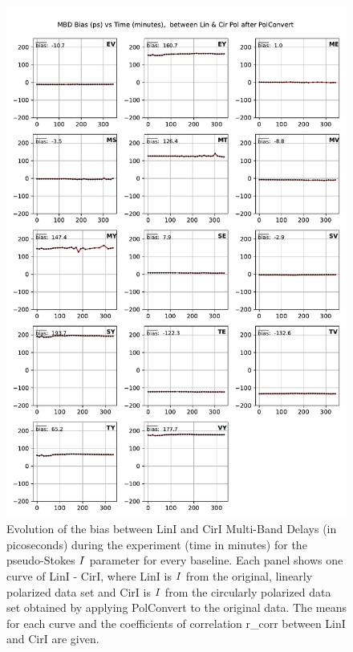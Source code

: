 \documentclass[letterpaper,twoside,12pt]{article}
\begin{document}
\begin{figure}[ht!]
  \begin{center}
  \includegraphics[width=33pc]{MBD_bias_between_Lin_I_and_Cir_I.pdf}
  \caption{\small Evolution of the bias between LinI and CirI Multi-Band Delays (in picoseconds) during the experiment (time in minutes) for the pseudo-Stokes $\protect I$ parameter for every baseline. Each panel shows one curve of LinI - CirI, where LinI is $\protect I$ from the original, linearly polarized data set and CirI is $\protect I$ from the circularly polarized data set obtained by applying PolConvert to the original data. The means for each curve and the coefficients of correlation r\_corr between LinI and CirI are given.}
  \label{mbd_lin_cir_bias}
  \end{center}
\end{figure}
\end{document}
